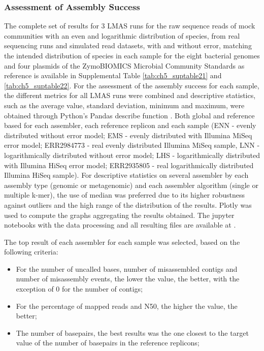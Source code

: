 \subsubsection{Assessment of Assembly Success} \label{ch5_sup_assembly_success}

The complete set of results for 3 LMAS runs for the raw sequence reads of mock communities with an even and logarithmic distribution of species, from real sequencing runs \cite{nicholls_ultra-deep_2019} and simulated read datasets, with and without error, matching the intended distribution of species in each sample for the eight bacterial genomes and four plasmids of the ZymoBIOMICS Microbial Community Standards as reference is available in Supplemental Table \ref{tab:ch5_suptable21} and \ref{tab:ch5_suptable22}. For the assessment of the assembly success for each sample, the different metrics for all LMAS runs were combined and descriptive statistics, such as the average value, standard deviation, minimum and maximum, were obtained through Python’s Pandas describe function \cite{noauthor_pandas_nodate, noauthor_pandasdataframedescribe_nodate}. Both global and reference based for each assembler, each reference replicon and each sample (ENN - evenly distributed without error model; EMS - evenly distributed with Illumina MiSeq error model; ERR2984773 - real evenly distributed Illumina MiSeq sample, LNN - logarithmically distributed without error model; LHS - logarithmically distributed  with Illumina HiSeq error model; ERR2935805 - real logarithmically distributed Illumina HiSeq sample). For descriptive statistics on several assembler by each assembly type (genomic or metagenomic) and each assembler algorithm (single or multiple k-mer), the use of median was preferred due to its higher robustness against outliers and the high range of the distribution of the results. Plotly \cite{noauthor_plotly_nodate} was used to compute the graphs aggregating the results obtained. The jupyter notebooks \cite{noauthor_project_nodate} with the data processing and all resulting files are available at \cite{noauthor_lmas_2022}. 

The top result of each assembler for each sample was selected, based on the following criteria:
\begin{itemize}
    \item For the number of uncalled bases, number of misassembled contigs and number of misassembly events, the lower the value, the better, with the exception of 0 for the number of contigs;
    \item For the percentage of mapped reads and N50, the higher the value, the better; 
    \item The number of basepairs, the best results was the one closest to the target value of the number of basepairs in the reference replicons;
\end{itemize}

